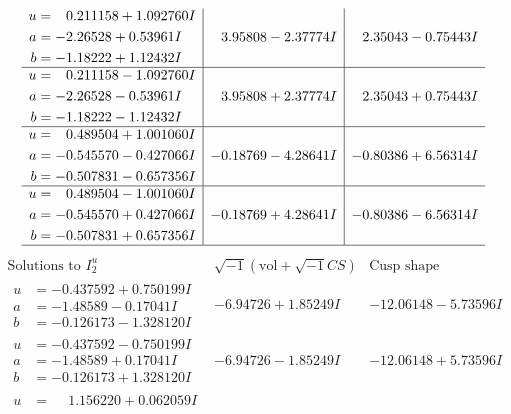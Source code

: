 \documentclass[1p]{elsarticle_modified}
\theoremstyle{definition}
\newcommand{\I}{\sqrt{-1}}
\begin{document}
$$\begin{array}{c|c|c}
\begin{aligned}
u &= \phantom{-}0.211158 + 1.092760 I \\
a &= -2.26528 + 0.53961 I \\
b &= -1.18222 + 1.12432 I\end{aligned}
 & \phantom{-}3.95808 - 2.37774 I & \phantom{-}2.35043 - 0.75443 I \\ \hline\begin{aligned}
u &= \phantom{-}0.211158 - 1.092760 I \\
a &= -2.26528 - 0.53961 I \\
b &= -1.18222 - 1.12432 I\end{aligned}
 & \phantom{-}3.95808 + 2.37774 I & \phantom{-}2.35043 + 0.75443 I \\ \hline\begin{aligned}
u &= \phantom{-}0.489504 + 1.001060 I \\
a &= -0.545570 - 0.427066 I \\
b &= -0.507831 - 0.657356 I\end{aligned}
 & -0.18769 - 4.28641 I & -0.80386 + 6.56314 I \\ \hline\begin{aligned}
u &= \phantom{-}0.489504 - 1.001060 I \\
a &= -0.545570 + 0.427066 I \\
b &= -0.507831 + 0.657356 I\end{aligned}
 & -0.18769 + 4.28641 I & -0.80386 - 6.56314 I\\
 \hline 
 \end{array}$$\newpage$$\begin{array}{c|c|c}  
\text{Solutions to }I^u_{2}& \I (\text{vol} + \sqrt{-1}CS) & \text{Cusp shape}\\
 \hline 
\begin{aligned}
u &= -0.437592 + 0.750199 I \\
a &= -1.48589 - 0.17041 I \\
b &= -0.126173 - 1.328120 I\end{aligned}
 & -6.94726 + 1.85249 I & -12.06148 - 5.73596 I \\ \hline\begin{aligned}
u &= -0.437592 - 0.750199 I \\
a &= -1.48589 + 0.17041 I \\
b &= -0.126173 + 1.328120 I\end{aligned}
 & -6.94726 - 1.85249 I & -12.06148 + 5.73596 I \\ \hline\begin{aligned}
u &= \phantom{-}1.156220 + 0.062059 I \\

\end{aligned}
\end{array}$$
\end{document}
